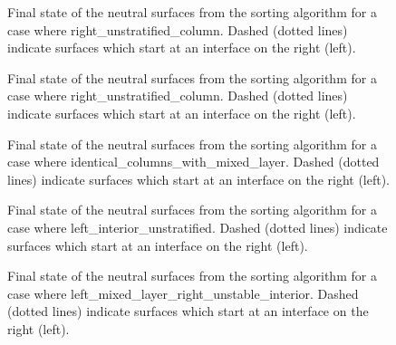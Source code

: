 \begin{figure}[ht]\begin{center}
  \caption{Final state of the neutral surfaces from the sorting algorithm for a case where right_unstratified_column. Dashed (dotted lines) indicate surfaces which start at an interface on the right (left).}
  \label{figure:right_unstratified_column} \end{center}
\end{figure}
\begin{figure}[ht]\begin{center}
  \caption{Final state of the neutral surfaces from the sorting algorithm for a case where right_unstratified_column. Dashed (dotted lines) indicate surfaces which start at an interface on the right (left).}
  \label{figure:right_unstratified_column} \end{center}
\end{figure}
\begin{figure}[ht]\begin{center}
  \caption{Final state of the neutral surfaces from the sorting algorithm for a case where identical_columns_with_mixed_layer. Dashed (dotted lines) indicate surfaces which start at an interface on the right (left).}
  \label{figure:identical_columns_with_mixed_layer} \end{center}
\end{figure}
\begin{figure}[ht]\begin{center}
  \caption{Final state of the neutral surfaces from the sorting algorithm for a case where left_interior_unstratified. Dashed (dotted lines) indicate surfaces which start at an interface on the right (left).}
  \label{figure:left_interior_unstratified} \end{center}
\end{figure}
\begin{figure}[ht]\begin{center}
  \caption{Final state of the neutral surfaces from the sorting algorithm for a case where left_mixed_layer_right_unstable_interior. Dashed (dotted lines) indicate surfaces which start at an interface on the right (left).}
  \label{figure:left_mixed_layer_right_unstable_interior} \end{center}
\end{figure}
